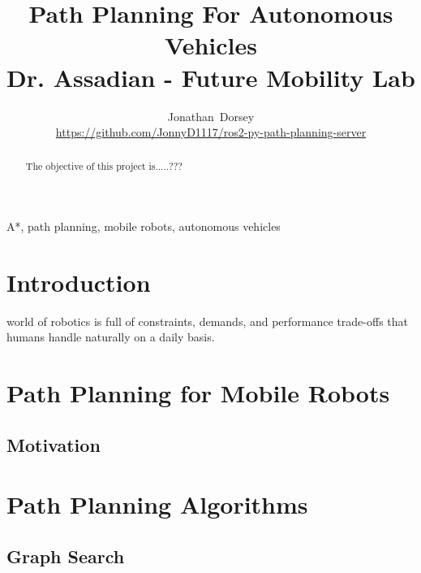 \documentclass[journal]{IEEEtran}
\begin{document}
\title{Path Planning For Autonomous Vehicles \\ Dr. Assadian - Future Mobility Lab}


\author{Jonathan~Dorsey  \\  \url{https://github.com/JonnyD1117/ros2-py-path-planning-server}}


%

\maketitle



\begin{abstract}
  The objective of this project is.....???
\end{abstract}

\begin{IEEEkeywords}
	A*, path planning, mobile robots, autonomous vehicles
\end{IEEEkeywords}


\IEEEpeerreviewmaketitle

\section{Introduction}

 world of robotics is full of constraints, demands, and performance trade-offs that humans handle naturally on a daily basis.

\section{Path Planning for Mobile Robots}


\subsection{ Motivation}

\section{Path Planning Algorithms}

\subsection{Graph Search}
\end{document}
